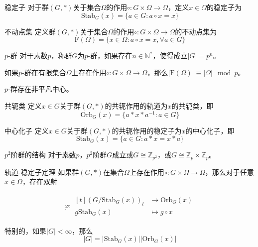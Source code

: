 \documentclass[lang = cn, scheme = chinese, thmcnt = section]{elegantbook}
\newcommand{\function}[5]{
	\begin{align*}
		#1:\begin{aligned}[t]
			#2 &\longrightarrow #3\\
			#4 &\longmapsto #5
		\end{aligned}
	\end{align*}
}                                     %
\begin{document}
\begin{definition}{稳定子}
	对于群$(G,*)$关于集合$\Omega$的作用$\circ:G\times \Omega\to \Omega$，定义$x\in\Omega$​的稳定子为
	$$
	\mathrm{Stab}_G(x)=\{ a\in G:a\circ x=x \}
	$$
\end{definition}

\begin{definition}{不动点集}
	定义群$(G,*)$关于集合$\Omega$的作用$\circ:G\times \Omega\to \Omega$的不动点集为
	$$
	\mathrm{F}(\Omega)=\{ x\in\Omega:a\circ x=x,\forall a\in G \}
	$$
\end{definition}

\begin{definition}{$p$-群}
	对于素数$p$，称群$G$为$p$-群，如果存在$n\in\mathbb{N}^*$，使得成立$|G|=p^n$。
\end{definition}

\begin{proposition}
	如果$p$-群在有限集合$\Omega$上存在作用$\circ:G\times \Omega\to \Omega$，那么$|\mathrm{F}(\Omega)|\equiv |\Omega|\mod p$。
\end{proposition}

\begin{proposition}
	$p$-群存在非平凡中心。
\end{proposition}

\begin{definition}{共轭类}
	定义$x\in G$关于群$(G,*)$的共轭作用的轨道为$x$​的共轭类，即
	$$
	\mathrm{Orb}_G(x)=\{ a*x*a^{-1}:a\in G \}
	$$
\end{definition}

\begin{definition}{中心化子}
	定义$x\in G$关于群$(G,*)$的共轭作用的稳定子为$x$​的中心化子，即
	$$
	\mathrm{Stab}_G(x)=\{ a\in G:a*x=x*a \}
	$$
\end{definition}

\begin{theorem}{$p^2$阶群的结构}
	对于素数$p$，$p^2$阶群$G$成立或$G\cong \mathbb{Z}_{p^2}$，或$G\cong \mathbb{Z}_p\times \mathbb{Z}_p$。
\end{theorem}

\begin{theorem}{轨道-稳定子定理}
	如果群$(G,*)$在集合$\Omega$上存在作用$\circ:G\times \Omega\to \Omega$，那么对于任意$x\in \Omega$，存在双射
	\function{\varphi}{(G/\mathrm{Stab}_G(x))_l}{\mathrm{Orb}_G(x)}{g\mathrm{Stab}_G(x)}{g\circ x}
	
	特别的，如果$|G|<\infty$，那么
	$$
	|G|=|\mathrm{Stab}_G(x)||\mathrm{Orb}_G(x)|
	$$
\end{theorem}
\end{document}
